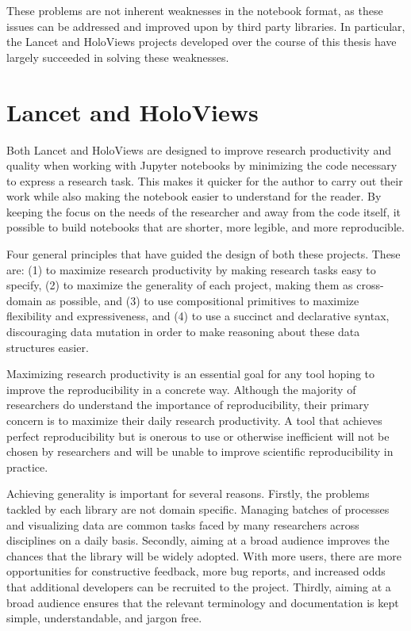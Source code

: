 \documentclass[phd,ianc,twoside]{infthesis}
\begin{document}
These problems are not inherent weaknesses in the notebook format, as these issues
can be addressed and improved upon by third party libraries. In
particular, the Lancet and HoloViews projects developed over the course
of this thesis have largely succeeded in solving these weaknesses.

\section{Lancet and HoloViews}

Both Lancet and HoloViews are designed to improve research productivity
and quality when working with Jupyter notebooks by minimizing the code
necessary to express a research task.  This makes it quicker for the
author to carry out their work while also making the notebook easier to
understand for the reader. By keeping the focus on the needs of the
researcher and away from the code itself, it possible to build notebooks
that are shorter, more legible, and more reproducible.

Four general principles that have guided the design of both these
projects. These are: (1) to maximize research productivity by making
research tasks easy to specify, (2) to maximize the generality of each
project, making them as cross-domain as possible, and (3) to use
compositional primitives to maximize flexibility and expressiveness, and (4)
to use a succinct and declarative syntax, discouraging data mutation in
order to make reasoning about these data structures easier.

Maximizing research productivity is an essential goal for any tool
hoping to improve the reproducibility in a concrete way. Although the
majority of researchers do understand the importance of reproducibility,
their primary concern is to maximize their daily research
productivity. A tool that achieves perfect reproducibility but is
onerous to use or otherwise inefficient will not be chosen by
researchers and will be unable to improve scientific reproducibility in
practice.

Achieving generality is important for several reasons. Firstly, the
problems tackled by each library are not domain specific. Managing
batches of processes and visualizing data are common tasks faced by many
researchers across disciplines on a daily basis. Secondly, aiming at a
broad audience improves the chances that the library will be widely
adopted. With more users, there are more opportunities for constructive
feedback, more bug reports, and increased odds that additional developers
can be recruited to the project. Thirdly, aiming at a broad audience
ensures that the relevant terminology and documentation is kept simple,
understandable, and jargon free.
\end{document}
